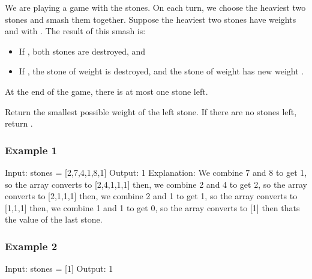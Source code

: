 \documentclass[letterpaper,12pt,english]{book}
\begin{document}
\sphinxAtStartPar
We are playing a game with the stones. On each turn, we choose the heaviest two stones and smash them together. Suppose the heaviest two stones have weights  and  with . The result of this smash is:
\begin{itemize}
\item {} 
\sphinxAtStartPar
If , both stones are destroyed, and

\item {} 
\sphinxAtStartPar
If , the stone of weight  is destroyed, and the stone of weight  has new weight .

\end{itemize}

\sphinxAtStartPar
At the end of the game, there is at most one stone left.

\sphinxAtStartPar
Return the smallest possible weight of the left stone. If there are no stones left, return .


\subsubsection{Example 1}
\label{\detokenize{Priority_Queue/1046_Last_Stone_Weight:example-1}}
\begin{sphinxVerbatim}[commandchars=\\\{\}]
Input: stones = [2,7,4,1,8,1]
Output: 1
Explanation: 
We combine 7 and 8 to get 1, so the array converts to [2,4,1,1,1] then,
we combine 2 and 4 to get 2, so the array converts to [2,1,1,1] then,
we combine 2 and 1 to get 1, so the array converts to [1,1,1] then,
we combine 1 and 1 to get 0, so the array converts to [1] then that\PYGZsq{}s the value of the last stone.
\end{sphinxVerbatim}


\subsubsection{Example 2}
\label{\detokenize{Priority_Queue/1046_Last_Stone_Weight:example-2}}
\begin{sphinxVerbatim}[commandchars=\\\{\}]
Input: stones = [1]
Output: 1
\end{sphinxVerbatim}
\end{document}
